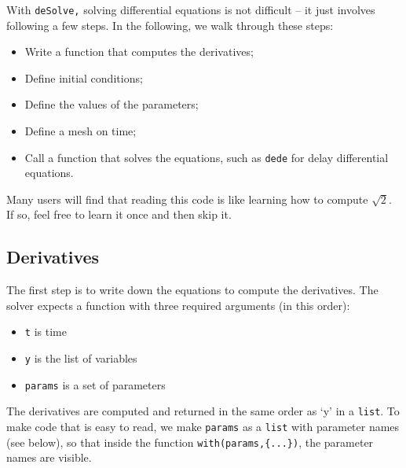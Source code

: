\documentclass[
]{book}
\begin{document}
With \texttt{deSolve,} solving differential equations is not difficult -- it just involves following a few steps. In the following, we walk through these steps:

\begin{itemize}
\item
  Write a function that computes the derivatives;
\item
  Define initial conditions;
\item
  Define the values of the parameters;
\item
  Define a mesh on time;
\item
  Call a function that solves the equations, such as \texttt{dede} for delay differential equations.
\end{itemize}

Many users will find that reading this code is like learning how to compute \(\sqrt{2}\). If so, feel free to learn it once and then skip it.

\hypertarget{derivatives}{%
\subsection{Derivatives}\label{derivatives}}

The first step is to write down the equations to compute the derivatives. The solver expects a function with three required arguments (in this order):

\begin{itemize}
\item
  \texttt{t} is time
\item
  \texttt{y} is the list of variables
\item
  \texttt{params} is a set of parameters
\end{itemize}

The derivatives are computed and returned in the same order as `y' in a \texttt{list}. To make code that is easy to read, we make \texttt{params} as a \texttt{list} with parameter names (see below), so that inside the function \texttt{with(params,\{...\})}, the parameter names are visible.
\end{document}
